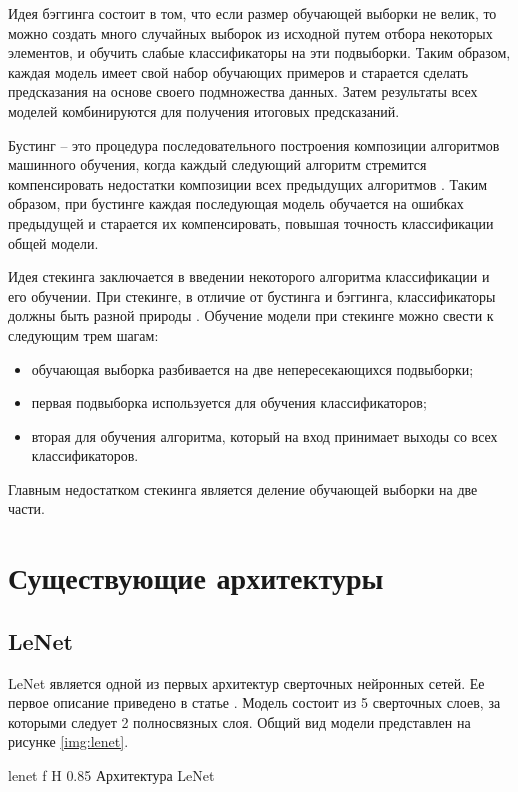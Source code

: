 Идея бэггинга состоит в том, что если размер обучающей выборки не велик, то можно создать много случайных выборок из исходной путем отбора некоторых элементов, и обучить слабые классификаторы на эти подвыборки. Таким образом, каждая модель имеет свой набор обучающих примеров и старается сделать предсказания на основе своего подмножества данных. Затем результаты всех моделей комбинируются для получения итоговых предсказаний.

Бустинг -- это процедура последовательного построения композиции алгоритмов машинного обучения, когда каждый следующий алгоритм стремится компенсировать недостатки композиции всех предыдущих алгоритмов \cite{ansambles}. Таким образом, при бустинге каждая последующая модель обучается на ошибках предыдущей и старается их компенсировать, повышая точность классификации общей модели.

Идея стекинга заключается в введении некоторого алгоритма классификации и его обучении. При стекинге, в отличие от бустинга и бэггинга, классификаторы должны быть разной природы \cite{ansambles}. Обучение модели при стекинге можно свести к следующим трем шагам:
\begin{itemize}
	\item обучающая выборка разбивается на две непересекающихся подвыборки;
	\item первая подвыборка используется для обучения классификаторов;
	\item вторая для обучения алгоритма, который на вход принимает выходы со всех классификаторов.
\end{itemize}

Главным недостатком стекинга является деление обучающей выборки на две части.

\section{Существующие архитектуры}
\subsection{LeNet}

LeNet является одной из первых архитектур сверточных нейронных сетей. Ее первое описание приведено в статье \cite{lenet}. Модель состоит из 5 сверточных слоев, за которыми следует 2 полносвязных слоя. Общий вид модели представлен на рисунке \ref{img:lenet}.

{lenet} %
{f} %
{H} %
{0.85\textwidth} %
{Архитектура LeNet} %

